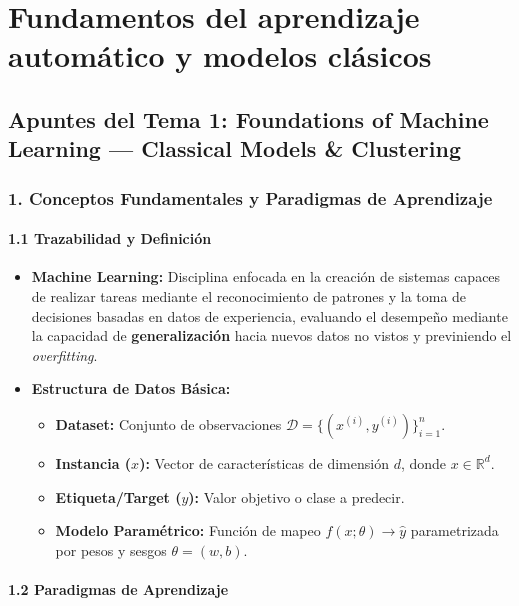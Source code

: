 \chapter{Fundamentos del aprendizaje automático y modelos clásicos}
\section{Apuntes del Tema 1: Foundations of Machine Learning — Classical Models \& Clustering}

\subsection{1. Conceptos Fundamentales y Paradigmas de Aprendizaje}

\subsubsection{1.1 Trazabilidad y Definición}

\begin{itemize}
	\item \textbf{Machine Learning:} Disciplina enfocada en la creación de sistemas capaces de realizar tareas mediante el reconocimiento de patrones y la toma de decisiones basadas en datos de experiencia, evaluando el desempeño mediante la capacidad de \textbf{generalización} hacia nuevos datos no vistos y previniendo el \emph{overfitting}.
	
	\item \textbf{Estructura de Datos Básica:}
	\begin{itemize}
		\item \textbf{Dataset:} Conjunto de observaciones $\mathcal{D} = \{(x^{(i)}, y^{(i)})\}_{i=1}^{n}$.
		\item \textbf{Instancia ($x$):} Vector de características de dimensión $d$, donde $x \in \mathbb{R}^d$.
		\item \textbf{Etiqueta/Target ($y$):} Valor objetivo o clase a predecir.
		\item \textbf{Modelo Paramétrico:} Función de mapeo $f(x; \theta) \rightarrow \hat{y}$ parametrizada por pesos y sesgos $\theta = (w, b)$.
	\end{itemize}
\end{itemize}

\subsubsection{1.2 Paradigmas de Aprendizaje}

